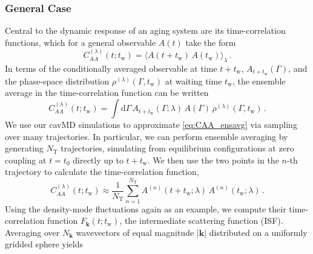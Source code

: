 \subsubsection{General Case}
Central to the dynamic response of an aging system are its time-correlation functions, which for a general observable $A(t)$ take the form
\begin{equation}
C_{AA}^{(\lambda)}(t; t_\mathrm{w}) = \langle A(t+t_\mathrm{w})\,A(t_\mathrm{w}) \rangle_\lambda \,.
\label{eq:NEQ_CAA_def}
\end{equation}
In terms of the conditionally averaged observable at time $t+t_\mathrm{w}$, $A_{t+t_\mathrm{w}}(\Gamma)$,  and the phase-space distribution $\rho^{(\lambda)}(\Gamma,t_\mathrm{w})$ at waiting time $t_\mathrm{w}$, the ensemble average in the time-correlation function can be written
\begin{equation}
C_{AA}^{(\lambda)}(t;t_\mathrm{w})
= \int \mathrm d\Gamma\,
A_{t+t_\mathrm{w}}(\Gamma; \lambda)\,A(\Gamma)\,
\rho^{(\lambda)}(\Gamma,t_\mathrm{w}) \,.
\label{eq:CAA_ensavg}
\end{equation}
We use our cavMD simulations to approximate \cref{eq:CAA_ensavg} via sampling over many trajectories. In particular, we can perform ensemble averaging by generating $N_\mathrm{T}$ trajectories, simulating from equilibrium configurations at zero coupling at $t = t_0$ directly up to $t+t_\mathrm{w}$. We then use the two points in the $n$-th trajectory to calculate the time-correlation function,
\begin{equation}
C_{AA}^{(\lambda)}(t;t_\mathrm{w}) \approx \frac{1}{N_\mathrm{T}} \sum_{n=1}^{N_\mathrm{T}}
A^{(n)}(t+t_\mathrm{w}; \lambda)\, A^{(n)}(t_\mathrm{w}; \lambda) \,.
\end{equation}
Using the density-mode fluctuations again as an example, we compute their time-correlation function $F_{\bm k}(t;t_\mathrm{w})$, the intermediate scattering function (ISF).\cite{hansen2013theory} Averaging over $N_{\bm k}$ wavevectors of equal magnitude $|\bm k|$ distributed on a uniformly gridded sphere yields

